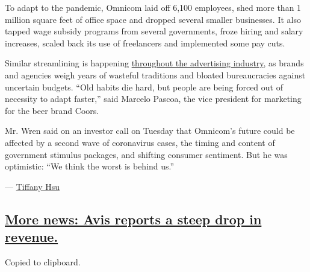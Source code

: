 To adapt to the pandemic, Omnicom laid off 6,100 employees, shed more
than 1 million square feet of office space and dropped several smaller
businesses. It also tapped wage subsidy programs from several
governments, froze hiring and salary increases, scaled back its use of
freelancers and implemented some pay cuts.

Similar streamlining is happening
\href{https://www.nytimes.com/2020/07/28/business/media/a-big-correction-pandemic-brings-change-to-bloated-ad-industry.html}{throughout
the advertising industry}, as brands and agencies weigh years of
wasteful traditions and bloated bureaucracies against uncertain budgets.
``Old habits die hard, but people are being forced out of necessity to
adapt faster,'' said Marcelo Pascoa, the vice president for marketing
for the beer brand Coors.

Mr. Wren said on an investor call on Tuesday that Omnicom's future could
be affected by a second wave of coronavirus cases, the timing and
content of government stimulus packages, and shifting consumer
sentiment. But he was optimistic: ``We think the worst is behind us.''

--- \href{https://www.nytimes.com/by/tiffany-hsu}{Tiffany Hsu}

\hypertarget{more-news-avis-reports-a-steep-drop-in-revenue}{%
\subsection{\texorpdfstring{\protect\hyperlink{more-news-avis-reports-a-steep-drop-in-revenue}{More
news: Avis reports a steep drop in
revenue.}}{More news: Avis reports a steep drop in revenue.}}\label{more-news-avis-reports-a-steep-drop-in-revenue}}

Copied to clipboard.

